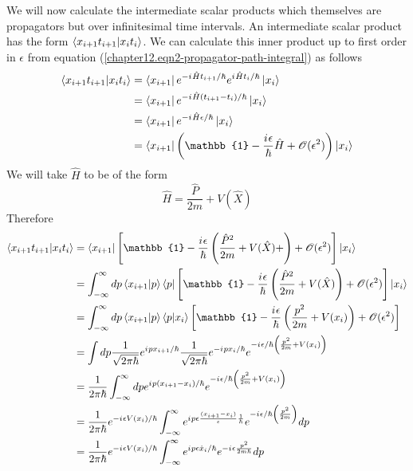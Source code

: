 \begin{enumerate}
	We will now calculate the intermediate scalar products which themselves are propagators but over infinitesimal time intervals. An intermediate scalar product has the form $\braket{x_{i+1} t_{i+1}}{x_i t_i}$. We can calculate this inner product up to first order in $\epsilon$ from equation (\ref{chapter12.eqn2-propagator-path-integral}) as follows
	\begin{align}
		\braket{x_{i+1} t_{i+1}}{x_i t_i} &= \bra{x_{i+1}} e^{-\iu \hat{H}t_{i+1}/\hbar}e^{\iu \hat{H}t_{i}/\hbar}\ket{x_i}\\
		&= \bra{x_{i+1}} e^{-\iu \hat{H}(t_{i+1} - t_i)/\hbar}\ket{x_i}\\
		&= \bra{x_{i+1}} e^{-\iu \hat{H}\epsilon/\hbar}\ket{x_i}\\
		&= \bra{x_{i+1}} \left(\mathbb{1} - \frac{\iu \epsilon}{\hbar}\hat{H} + \mathcal{O}(\epsilon^2)\right)\ket{x_i}
	\end{align}
	We will take $\hat{H}$ to be of the form
	\begin{equation}
		\hat{H} = \frac{\hat{P}}{2 m} + V(\hat{X})
	\end{equation}
	Therefore
	\begin{align}
		\braket{x_{i+1} t_{i+1}}{x_i t_i} 
		&= \bra{x_{i+1}}\left[\mathbb{1} - \frac{\iu \epsilon}{\hbar}\left(\frac{\hat{P}^2}{2 m} + V(\hat{X}) + \right) + \mathcal{O}(\epsilon^2)\right]\ket{x_i}\\
		&= \int_{-\infty}^{\infty} dp \braket{x_{i+1}}{p} \bra{p} \left[\mathbb{1} - \frac{\iu \epsilon}{\hbar}\left(\frac{\hat{P}^2}{2 m} + V(\hat{X})\right) + \mathcal{O}(\epsilon^2)\right] \ket{x_i} \\
		&= \int_{-\infty}^{\infty} dp \braket{x_{i+1}}{p} \braket{p}{x_i} \left[\mathbb{1} - \frac{\iu \epsilon}{\hbar}\left(\frac{p^2}{2 m} + V(x_i)\right) + \mathcal{O}(\epsilon^2)\right]  \\
		&= \int dp \frac{1}{\sqrt{2\pi \hbar}}e^{\iu p x_{i+1}/\hbar}\frac{1}{\sqrt{2\pi \hbar}}e^{-\iu p x_{i}/\hbar} e^{-\iu \epsilon/\hbar \left( \frac{p^2}{2 m} + V(x_i) \right)} \\
		&= \frac{1}{2\pi\hbar} \int_{-\infty}^{\infty} dp e^{\iu p (x_{i+1} - x_i)/\hbar} e^{-\iu \epsilon/\hbar \left( \frac{p^2}{2 m} + V(x_i) \right)} \\
		&= \frac{1}{2\pi\hbar} e^{-\iu \epsilon V(x_i)/\hbar} \int_{-\infty}^{\infty} e^{\iu p \epsilon\frac{(x_{i+1} - x_i)}{\epsilon}\frac{1}{\hbar}} e^{-\iu \epsilon/\hbar \left( \frac{p^2}{2 m}\right)} dp\\
		&= \frac{1}{2\pi\hbar} e^{-\iu \epsilon V(x_i)/\hbar} \int_{-\infty}^{\infty} e^{\iu p \epsilon \dot{x}_i / \hbar} e^{-\iu \epsilon \frac{p^2}{2 m \hbar}} dp \\

\end{align}
\end{enumerate}
